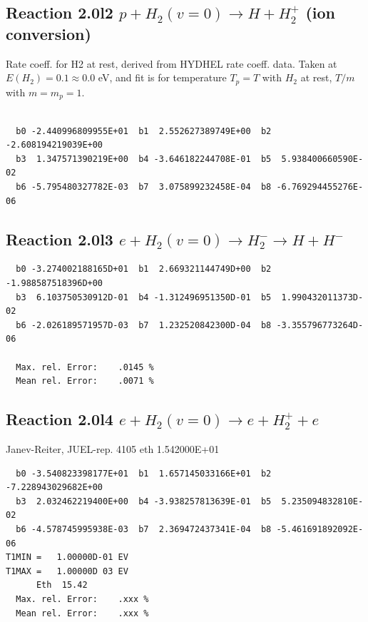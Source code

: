 \documentclass[12pt,dvipdfmx]{article}
\begin{document}
\subsection{
Reaction 2.0l2
$ p + H_2(v=0) \rightarrow H + H_2^+$ (ion conversion)
}
Rate coeff. for H2 at rest, derived from HYDHEL rate coeff. data.
Taken at $E(H_2) = 0.1 \approx 0.0$ eV,  and fit is for temperature $T_p=T$ with $H_2$ at rest,
$T/m$ with $m=m_p=1$.

\begin{small}\begin{verbatim}

  b0 -2.440996809955E+01  b1  2.552627389749E+00  b2 -2.608194219039E+00
  b3  1.347571390219E+00  b4 -3.646182244708E-01  b5  5.938400660590E-02
  b6 -5.795480327782E-03  b7  3.075899232458E-04  b8 -6.769294455276E-06

\end{verbatim}\end{small}

\newpage

\subsection{
Reaction 2.0l3
 $ e + H_2(v=0) \rightarrow H_2^- \rightarrow H + H^-$
}


\begin{small}\begin{verbatim}
  b0 -3.274002188165D+01  b1  2.669321144749D+00  b2 -1.988587518396D+00
  b3  6.103750530912D-01  b4 -1.312496951350D-01  b5  1.990432011373D-02
  b6 -2.026189571957D-03  b7  1.232520842300D-04  b8 -3.355796773264D-06

  Max. rel. Error:    .0145 %
  Mean rel. Error:    .0071 %
\end{verbatim}\end{small}


\subsection{
Reaction 2.0l4
 $ e + H_2(v=0) \rightarrow e + H_2^+ + e$
}
Janev-Reiter, JUEL-rep. 4105 \cite{kn:JRS} eth 1.542000E+01

\begin{small}\begin{verbatim}
  b0 -3.540823398177E+01  b1  1.657145033166E+01  b2 -7.228943029682E+00
  b3  2.032462219400E+00  b4 -3.938257813639E-01  b5  5.235094832810E-02
  b6 -4.578745995938E-03  b7  2.369472437341E-04  b8 -5.461691892092E-06
T1MIN =   1.00000D-01 EV
T1MAX =   1.00000D 03 EV
      Eth  15.42
  Max. rel. Error:    .xxx %
  Mean rel. Error:    .xxx %
\end{verbatim}\end{small}
\end{document}
